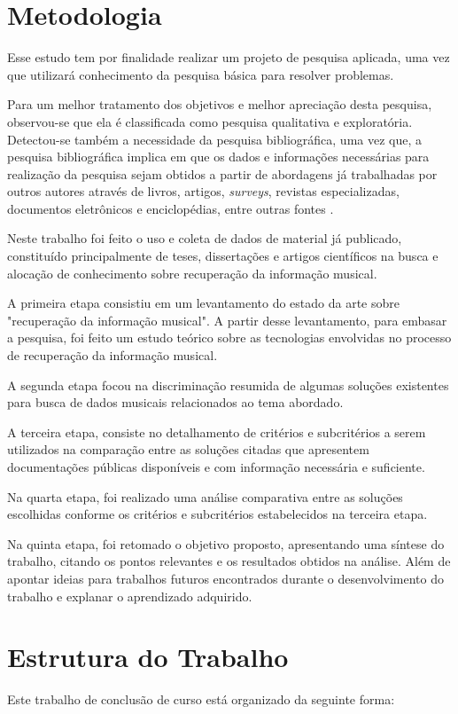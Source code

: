 \section{Metodologia}

Esse estudo tem por finalidade realizar um projeto de pesquisa aplicada, uma vez que utilizará conhecimento da pesquisa básica para resolver problemas.

Para um melhor tratamento dos objetivos e melhor apreciação desta pesquisa, observou-se que ela é classificada como pesquisa qualitativa e exploratória. Detectou-se também a necessidade da pesquisa bibliográfica, uma vez que, a pesquisa bibliográfica implica em que os dados e informações necessárias para realização da pesquisa sejam obtidos a partir de abordagens já trabalhadas por outros autores através de livros, artigos, \textit{surveys}, revistas especializadas, documentos eletrônicos e enciclopédias, entre outras fontes \cite{ednalucia2005}.

Neste trabalho foi feito o uso e coleta de dados de material já publicado, constituído principalmente de teses, dissertações e artigos científicos na busca e alocação de conhecimento sobre recuperação da informação musical.

A primeira etapa consistiu em um levantamento do estado da arte sobre "recuperação da informação musical". A partir desse levantamento, para embasar a pesquisa, foi feito um estudo teórico sobre as tecnologias envolvidas no processo de recuperação da informação musical.

A segunda etapa focou na discriminação resumida de algumas soluções existentes para busca de dados musicais relacionados ao tema abordado.

A terceira etapa, consiste no detalhamento de critérios e subcritérios a serem utilizados na comparação entre as soluções citadas que apresentem documentações públicas disponíveis e com informação necessária e suficiente.

Na quarta etapa, foi realizado uma análise comparativa entre as soluções escolhidas conforme os critérios e subcritérios estabelecidos na terceira etapa.

Na quinta etapa, foi retomado o objetivo proposto, apresentando uma síntese do trabalho, citando os pontos relevantes e os resultados obtidos na análise. Além de apontar ideias para trabalhos futuros encontrados durante o desenvolvimento do trabalho e explanar o aprendizado adquirido.

\section{Estrutura do Trabalho}
Este trabalho de conclusão de curso está organizado da seguinte forma: 

